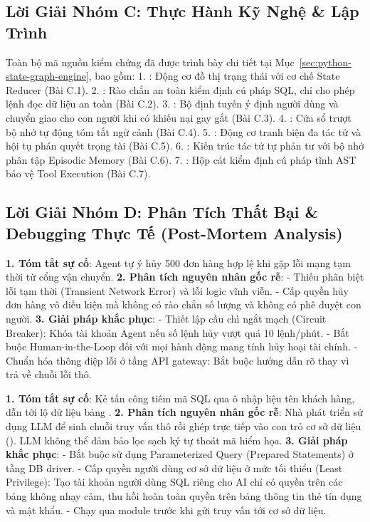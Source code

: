 \subsection{Lời Giải Nhóm C: Thực Hành Kỹ Nghệ \& Lập Trình}
Toàn bộ mã nguồn kiểm chứng đã được trình bày chi tiết tại Mục~\ref{sec:python-state-graph-engine}, bao gồm:
1. : Động cơ đồ thị trạng thái với cơ chế State Reducer (Bài C.1).
2. : Rào chắn an toàn kiểm định cú pháp SQL, chỉ cho phép lệnh đọc dữ liệu an toàn (Bài C.2).
3. : Bộ định tuyến ý định người dùng và chuyển giao cho con người khi có khiếu nại gay gắt (Bài C.3).
4. : Cửa sổ trượt bộ nhớ tự động tóm tắt ngữ cảnh (Bài C.4).
5. : Động cơ tranh biện đa tác tử và hội tụ phán quyết trọng tài (Bài C.5).
6. : Kiến trúc tác tử tự phản tư với bộ nhớ phân tập Episodic Memory (Bài C.6).
7. : Hộp cát kiểm định cú pháp tĩnh AST bảo vệ Tool Execution (Bài C.7).

\subsection{Lời Giải Nhóm D: Phân Tích Thất Bại \& Debugging Thực Tế (Post-Mortem Analysis)}

\begin{debugbox}
\textbf{1. Tóm tắt sự cố}: Agent tự ý hủy 500 đơn hàng hợp lệ khi gặp lỗi mạng tạm thời từ cổng vận chuyển.
\textbf{2. Phân tích nguyên nhân gốc rễ}:
- Thiếu phân biệt lỗi tạm thời (Transient Network Error) và lỗi logic vĩnh viễn.
- Cấp quyền hủy đơn hàng vô điều kiện mà không có rào chắn số lượng và không có phê duyệt con người.
\textbf{3. Giải pháp khắc phục}:
- Thiết lập cầu chì ngắt mạch (Circuit Breaker): Khóa tài khoản Agent nếu số lệnh hủy vượt quá 10 lệnh/phút.
- Bắt buộc Human-in-the-Loop đối với mọi hành động mang tính hủy hoại tài chính.
- Chuẩn hóa thông điệp lỗi ở tầng API gateway: Bắt buộc hướng dẫn rõ  thay vì trả về chuỗi lỗi thô.
\end{debugbox}

\begin{debugbox}
\textbf{1. Tóm tắt sự cố}: Kẻ tấn công tiêm mã SQL qua ô nhập liệu tên khách hàng, dẫn tới lộ dữ liệu bảng .
\textbf{2. Phân tích nguyên nhân gốc rễ}:
Nhà phát triển sử dụng LLM để sinh chuỗi truy vấn thô rồi ghép trực tiếp vào con trỏ cơ sở dữ liệu (). LLM không thể đảm bảo lọc sạch ký tự thoát mã hiểm họa.
\textbf{3. Giải pháp khắc phục}:
- Bắt buộc sử dụng Parameterized Query (Prepared Statements) ở tầng DB driver.
- Cấp quyền người dùng cơ sở dữ liệu ở mức tối thiểu (Least Privilege): Tạo tài khoản người dùng SQL riêng cho AI chỉ có quyền  trên các bảng không nhạy cảm, thu hồi hoàn toàn quyền trên bảng thông tin thẻ tín dụng và mật khẩu.
- Chạy qua module  trước khi gửi truy vấn tới cơ sở dữ liệu.
\end{debugbox}

